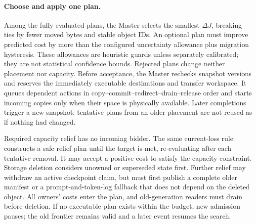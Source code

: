 \paragraph{Choose and apply one plan.}
Among the fully evaluated plans, the Master selects the smallest
$\Delta J$, breaking ties by fewer moved bytes and stable object IDs.
An optional plan must improve predicted cost by more than the configured
uncertainty allowance plus migration hysteresis. These allowances are
heuristic guards unless separately calibrated; they are not statistical
confidence bounds. Rejected plans change neither placement nor capacity.
Before acceptance, the Master rechecks snapshot versions and reserves
the immediately executable destinations and transfer workspace. It queues
dependent actions in copy--commit--redirect--drain--release order and
starts incoming copies only when their space is physically available.
Later completions trigger a new snapshot; tentative plans from an older
placement are not reused as if nothing had changed.

Required capacity relief has no incoming bidder. The same current-loss
rule constructs a safe relief plan until the target is met, re-evaluating
after each tentative removal. It may accept a positive cost to satisfy
the capacity constraint. Storage deletion considers unowned or superseded
state first. Further relief may withdraw an active checkpoint claim,
but must first publish a complete older manifest or a prompt-and-token-log
fallback that does not depend on the deleted object. All owners' costs
enter the plan, and old-generation readers must drain before deletion.
If no executable plan exists within the budget, new admission pauses;
the old frontier remains valid and a later event resumes the search.


